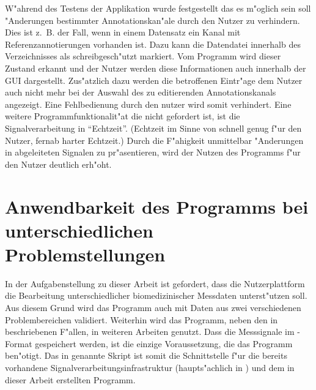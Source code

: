 W"ahrend des Testens der Applikation wurde festgestellt das es m"oglich sein soll "Anderungen bestimmter Annotationskan"ale durch den Nutzer zu verhindern.
Dies ist z.~B. der Fall, wenn in einem Datensatz ein Kanal mit Referenzannotierungen vorhanden ist.
Dazu kann die Datendatei innerhalb des Verzeichnisses als schreibgesch"utzt markiert.
Vom Programm wird dieser Zustand erkannt und der Nutzer werden diese Informationen auch innerhalb der \ac{GUI} dargestellt.
Zus"atzlich dazu werden die betroffenen Eintr"age dem Nutzer auch nicht mehr bei der Auswahl des zu editierenden Annotationskanals angezeigt.
Eine Fehlbedienung durch den nutzer wird somit verhindert.
Eine weitere Programmfunktionalit"at die nicht gefordert ist, ist die Signalverarbeitung in "`Echtzeit"'.
(Echtzeit im Sinne von schnell genug f"ur den Nutzer, fernab harter Echtzeit.)
Durch die F"ahigkeit unmittelbar "Anderungen in abgeleiteten Signalen zu pr"asentieren, wird der Nutzen des Programms f"ur den Nutzer deutlich erh"oht.


\section{Anwendbarkeit des Programms bei unterschiedlichen Problemstellungen}

In der Aufgabenstellung zu dieser Arbeit ist gefordert, dass die Nutzerplattform die Bearbeitung unterschiedlicher biomedizinischer Messdaten unterst"utzen soll.
Aus diesem Grund wird das Programm auch mit Daten aus zwei verschiedenen Problembereichen validiert.
Weiterhin wird das Programm, neben den in  beschriebenen F"allen, in weiteren Arbeiten genutzt.
Dass die Messsignale im \usNS-Format gespeichert werden, ist die einzige Voraussetzung, die das Programm ben"otigt.
Das in  genannte Skript ist somit die Schnittstelle f"ur die bereits vorhandene Signalverarbeitungsinfrastruktur (haupts"achlich in \mlNS) und dem in dieser Arbeit erstellten Programm.





